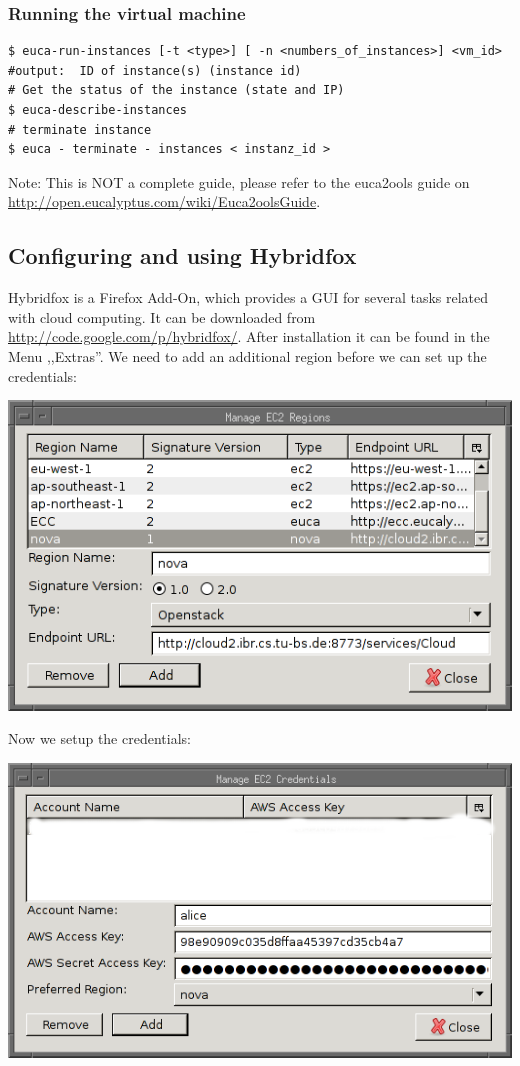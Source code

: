 \documentclass[a4paper,ngerman,bibtotocliststotoc]{scrartcl}
\begin{document}
\subsubsection{Running the virtual machine}
\label{sec:runn-virt-mach}
\begin{verbatim}
$ euca-run-instances [-t <type>] [ -n <numbers_of_instances>] <vm_id>
#output:  ID of instance(s) (instance id)
# Get the status of the instance (state and IP)
$ euca-describe-instances  
# terminate instance
$ euca - terminate - instances < instanz_id >
\end{verbatim}
Note: This is NOT a complete guide, please refer to the euca2ools
guide \cite{eucatools} on \url{http://open.eucalyptus.com/wiki/Euca2oolsGuide}.
\subsection{Configuring and using Hybridfox}
\label{sec:conf-hybr}
Hybridfox is a Firefox Add-On, which provides a GUI for several tasks
related with cloud computing. It can be downloaded from
\url{http://code.google.com/p/hybridfox/}. 
After installation it can be found in the Menu ,,Extras''.
We need to add an
additional region before we can set up the credentials:%
\begin{center}
\includegraphics{hybridfox_regions}
\end{center}
Now we setup the credentials:
\begin{center}
  \includegraphics{hybrid_creds}
\end{center}
\end{document}
